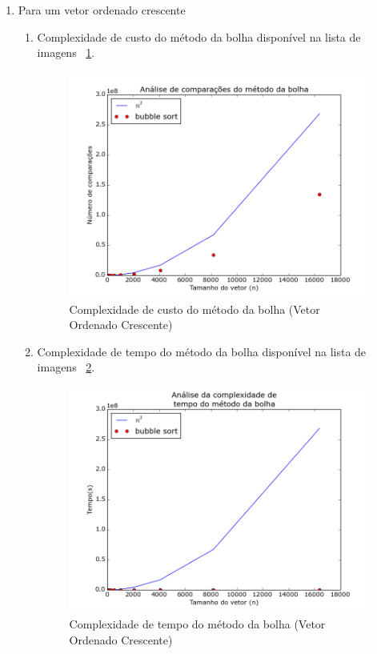 \documentclass[12pt,a4paper,twoside]{report}
\begin{document}
\begin{enumerate}
\begin{enumerate}
	\end{enumerate}
	
	\item Para um vetor ordenado crescente
		\begin{enumerate}
			\item Complexidade de custo do método da bolha disponível na lista de imagens ~\ref{fig:BubblePlot1OC}.
			\begin{figure}[!h]
				\centering
				\includegraphics[scale=0.6]{../imagens/Bubble/bubble_plot_1_ordenado_crescente.png}
				\caption{Complexidade de custo do método da bolha (Vetor Ordenado Crescente)\label{fig:BubblePlot1OC}}
			\end{figure}
			
			
			\item Complexidade de tempo do método da bolha disponível na lista de imagens ~\ref{fig:BubblePlot2OC}.
			\begin{figure}[!h]
				\centering
				\includegraphics[scale=0.6]{../imagens/Bubble/bubble_plot_2_ordenado_crescente.png}
				\caption{Complexidade de tempo do método da bolha (Vetor Ordenado Crescente) \label{fig:BubblePlot2OC}}
			\end{figure}
			

\end{enumerate}
\end{enumerate}
\end{document}
